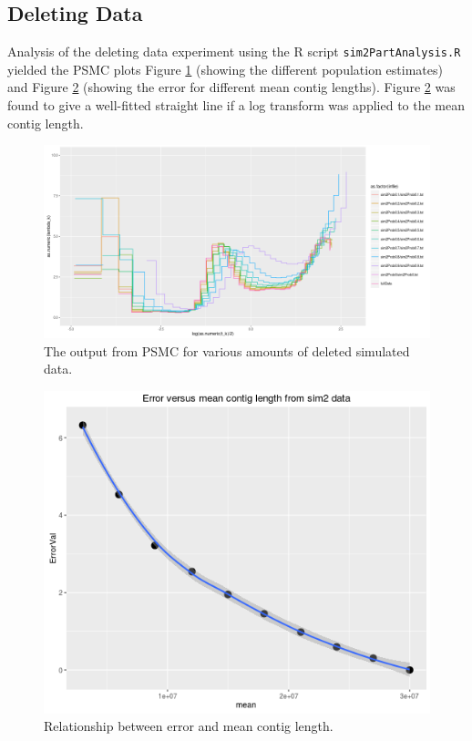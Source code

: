 \documentclass[11pt,a4paper]{article}
\begin{document}
\subsection{Deleting Data}
Analysis of the deleting data experiment using the R script \verb|sim2PartAnalysis.R| yielded the PSMC plots Figure \ref{deletedDataPsmcPlots} (showing the different population estimates) and Figure \ref{sim2ErrorVsMeanContigLength} (showing the error for different mean contig lengths). Figure \ref{sim2ErrorVsMeanContigLength} was found to give a well-fitted straight line if a log transform was applied to the mean contig length.

\begin{figure}[h]
  \center
  \includegraphics[width=1\linewidth]{figures/deletedDataPsmcPlots.png}
  \caption{The output from PSMC for various amounts of deleted simulated data.}\label{deletedDataPsmcPlots}
\end{figure}

\begin{figure}[h]
  \center
  \includegraphics[width=.7\linewidth]{figures/sim2ErrorVsMeanContigLength.png}
  \caption{Relationship between error and mean contig length.}\label{sim2ErrorVsMeanContigLength}
\end{figure}
\end{document}
